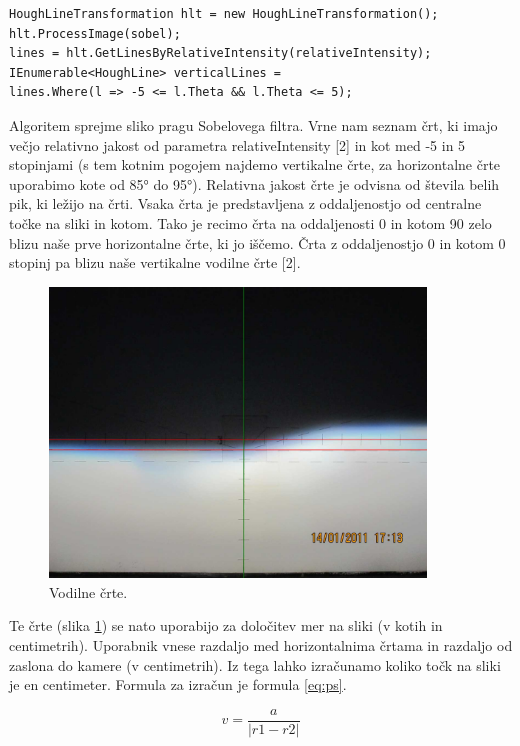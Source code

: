 \documentclass[oneside, a4paper, 12pt]{book}
\begin{document}
\begin{verbatim}
HoughLineTransformation hlt = new HoughLineTransformation();
hlt.ProcessImage(sobel);
lines = hlt.GetLinesByRelativeIntensity(relativeIntensity);
IEnumerable<HoughLine> verticalLines = 
lines.Where(l => -5 <= l.Theta && l.Theta <= 5);
\end{verbatim}


Algoritem sprejme sliko pragu Sobelovega filtra. Vrne nam seznam črt, ki imajo večjo relativno jakost od parametra relativeIntensity [2] in kot med -5 in 5 stopinjami (s tem kotnim pogojem najdemo vertikalne črte, za horizontalne črte uporabimo kote od 85° do 95°). Relativna jakost črte je odvisna od števila belih pik, ki ležijo na črti. Vsaka črta je predstavljena z oddaljenostjo od centralne točke na sliki in kotom. Tako je recimo črta na oddaljenosti 0 in kotom 90 zelo blizu naše prve horizontalne črte, ki jo iščemo. Črta z oddaljenostjo 0 in kotom 0 stopinj pa blizu naše vertikalne vodilne črte [2]. 

\begin{figure}
\begin{center}
\includegraphics[width=10cm]{slike/vodilne-crte.jpg}
\end{center}
\caption{Vodilne črte.}
\label{pic:vodilne-crte}
\end{figure}

Te črte (slika \ref{pic:vodilne-crte}) se nato uporabijo za določitev mer na sliki (v kotih in centimetrih). Uporabnik vnese razdaljo med horizontalnima črtama in razdaljo od zaslona do kamere (v centimetrih). Iz tega lahko izračunamo koliko točk na sliki je en centimeter. Formula za izračun je formula \ref{eq:ps}.

\begin{equation}
v=\dfrac{a}{|r1-r2|}
\label{eq:ps}
\end{equation}
\end{document}
